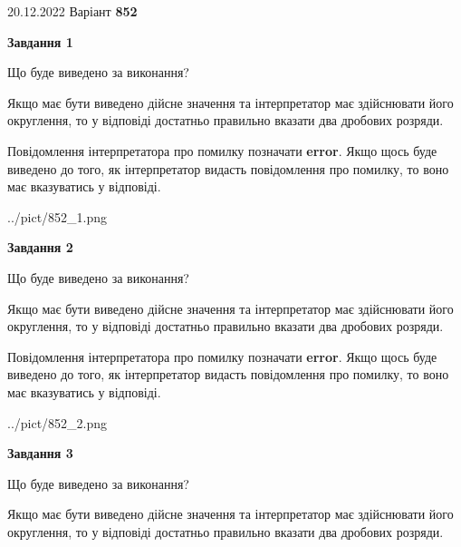 \documentclass[12pt, ukrainian]{article}
\begin{document}
{20.12.2022 Варіант \No \textbf { 852 }\par}
{
\begin {Large}

{\begin {center}\textbf{Завдання 1}\end {center}}\par
Що буде виведено за виконання? \par

Якщо має бути виведено дійсне значення та інтерпретатор має здійснювати його округлення, 
то у відповіді достатньо правильно вказати два дробових розряди.

Повідомлення інтерпретатора про помилку позначати \textbf{error}.
Якщо щось буде виведено до того, як інтерпретатор видасть повідомлення про помилку, 
то воно має вказуватись у відповіді. \par

\begin{center}
	{../pict/852_1.png}
\end{center}
\newpage

{\begin {center}\textbf{Завдання 2}\end {center}}\par
Що буде виведено за виконання? \par

Якщо має бути виведено дійсне значення та інтерпретатор має здійснювати його округлення, 
то у відповіді достатньо правильно вказати два дробових розряди.

Повідомлення інтерпретатора про помилку позначати \textbf{error}.
Якщо щось буде виведено до того, як інтерпретатор видасть повідомлення про помилку, 
то воно має вказуватись у відповіді. \par

\begin{center}
	{../pict/852_2.png}
\end{center}
\newpage

{\begin {center}\textbf{Завдання 3}\end {center}}\par
Що буде виведено за виконання? \par

Якщо має бути виведено дійсне значення та інтерпретатор має здійснювати його округлення, 
то у відповіді достатньо правильно вказати два дробових розряди.


\end{Large}}
\end{document}
